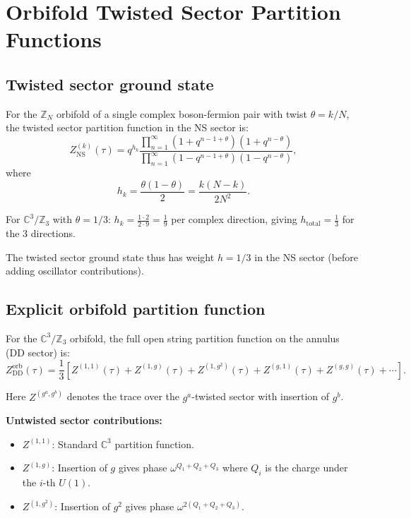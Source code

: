 \documentclass[11pt]{article}
\newcommand{\Z}{\mathbb{Z}}
\newcommand{\C}{\mathbb{C}}
\begin{document}
\section{Orbifold Twisted Sector Partition Functions}\label{app:twisted}

\subsection{Twisted sector ground state}

For the $\Z_N$ orbifold of a single complex boson-fermion pair with twist $\theta = k/N$, the twisted sector partition function in the NS sector is:
\begin{equation}
Z^{(k)}_{\text{NS}}(\tau) = q^{h_k} \frac{\prod_{n=1}^\infty (1 + q^{n - 1 + \theta})(1 + q^{n - \theta})}{\prod_{n=1}^\infty (1 - q^{n - 1 + \theta})(1 - q^{n - \theta})},
\end{equation}
where
\begin{equation}
h_k = \frac{\theta(1-\theta)}{2} = \frac{k(N-k)}{2N^2}.
\end{equation}

For $\C^3/\Z_3$ with $\theta = 1/3$: $h_k = \frac{1 \cdot 2}{2 \cdot 9} = \frac{1}{9}$ per complex direction, giving $h_{\text{total}} = \frac{1}{3}$ for the 3 directions.

The twisted sector ground state thus has weight $h = 1/3$ in the NS sector (before adding oscillator contributions).

\subsection{Explicit orbifold partition function}

For the $\C^3/\Z_3$ orbifold, the full open string partition function on the annulus (DD sector) is:
\begin{equation}
Z^{\text{orb}}_{\text{DD}}(\tau) = \frac{1}{3} \left[ Z^{(1,1)}(\tau) + Z^{(1,g)}(\tau) + Z^{(1,g^2)}(\tau) + Z^{(g,1)}(\tau) + Z^{(g,g)}(\tau) + \cdots \right].
\end{equation}

Here $Z^{(g^a, g^b)}$ denotes the trace over the $g^a$-twisted sector with insertion of $g^b$.

\textbf{Untwisted sector contributions:}
\begin{itemize}
\item $Z^{(1,1)}$: Standard $\C^3$ partition function.
\item $Z^{(1,g)}$: Insertion of $g$ gives phase $\omega^{Q_1 + Q_2 + Q_3}$ where $Q_i$ is the charge under the $i$-th $U(1)$.
\item $Z^{(1,g^2)}$: Insertion of $g^2$ gives phase $\omega^{2(Q_1 + Q_2 + Q_3)}$.
\end{itemize}
\end{document}
